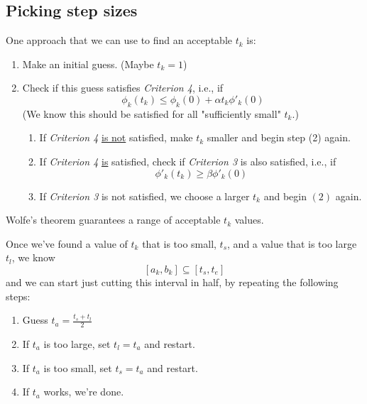 \documentclass[11pt]{elegantbook}
\begin{document}
\subsection{Picking step sizes}
One approach that we can use to find an acceptable $t_k$ is:
\begin{enumerate}[(1)]
    \item Make an initial guess. (Maybe $t_k=1$)
    \item Check if this guess satisfies \textit{Criterion 4}, i.e., if $$\phi_k(t_k)\leq \phi_k(0)+\alpha t_k\phi'_k(0)$$
    (We know this should be satisfied for all "sufficiently small" $t_k$.)
    \begin{enumerate}[$\bullet$]
        \item If \textit{Criterion 4} \underline{is not} satisfied, make $t_k$ smaller and begin step (2) again.
        \item If \textit{Criterion 4} \underline{is} satisfied, check if \textit{Criterion 3} is also satisfied, i.e., if $$\phi'_k(t_k)\geq \beta\phi'_k(0)$$
        \item If \textit{Criterion 3} is not satisfied, we choose a larger $t_k$ and begin $(2)$ again.
    \end{enumerate}
\end{enumerate}
Wolfe's theorem guarantees a range of acceptable $t_k$ values.

\begin{example}
    Once we've found a value of $t_k$ that is too small, $t_s$, and a value that is too large $t_l$, we know $$[a_k,b_k]\subseteq [t_s,t_e]$$
    and we can start just cutting this interval in half, by repeating the following steps:
    \begin{enumerate}[(1)]
        \item Guess $t_a=\frac{t_s+t_l}{2}$
        \item If $t_a$ is too large, set $t_l=t_a$ and restart.
        \item If $t_a$ is too small, set $t_s=t_a$ and restart.
        \item If $t_a$ works, we're done.
    \end{enumerate}
\end{example}
\end{document}
